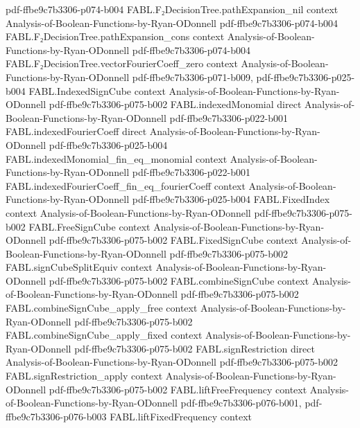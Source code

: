\begin{theorem}
  {pdf-ffbe9c7b3306-p074-b004}
\proofstep
  {FABL.F₂DecisionTree.pathExpansion_nil}
  {context}
  {Analysis-of-Boolean-Functions-by-Ryan-ODonnell}
  {pdf-ffbe9c7b3306-p074-b004}
\proofstep
  {FABL.F₂DecisionTree.pathExpansion_cons}
  {context}
  {Analysis-of-Boolean-Functions-by-Ryan-ODonnell}
  {pdf-ffbe9c7b3306-p074-b004}
\proofstep
  {FABL.F₂DecisionTree.vectorFourierCoeff_zero}
  {context}
  {Analysis-of-Boolean-Functions-by-Ryan-ODonnell}
  {pdf-ffbe9c7b3306-p071-b009,
    pdf-ffbe9c7b3306-p025-b004}
\proofstep
  {FABL.IndexedSignCube}
  {context}
  {Analysis-of-Boolean-Functions-by-Ryan-ODonnell}
  {pdf-ffbe9c7b3306-p075-b002}
\proofstep
  {FABL.indexedMonomial}
  {direct}
  {Analysis-of-Boolean-Functions-by-Ryan-ODonnell}
  {pdf-ffbe9c7b3306-p022-b001}
\proofstep
  {FABL.indexedFourierCoeff}
  {direct}
  {Analysis-of-Boolean-Functions-by-Ryan-ODonnell}
  {pdf-ffbe9c7b3306-p025-b004}
\proofstep
  {FABL.indexedMonomial_fin_eq_monomial}
  {context}
  {Analysis-of-Boolean-Functions-by-Ryan-ODonnell}
  {pdf-ffbe9c7b3306-p022-b001}
\proofstep
  {FABL.indexedFourierCoeff_fin_eq_fourierCoeff}
  {context}
  {Analysis-of-Boolean-Functions-by-Ryan-ODonnell}
  {pdf-ffbe9c7b3306-p025-b004}
\proofstep
  {FABL.FixedIndex}
  {context}
  {Analysis-of-Boolean-Functions-by-Ryan-ODonnell}
  {pdf-ffbe9c7b3306-p075-b002}
\proofstep
  {FABL.FreeSignCube}
  {context}
  {Analysis-of-Boolean-Functions-by-Ryan-ODonnell}
  {pdf-ffbe9c7b3306-p075-b002}
\proofstep
  {FABL.FixedSignCube}
  {context}
  {Analysis-of-Boolean-Functions-by-Ryan-ODonnell}
  {pdf-ffbe9c7b3306-p075-b002}
\proofstep
  {FABL.signCubeSplitEquiv}
  {context}
  {Analysis-of-Boolean-Functions-by-Ryan-ODonnell}
  {pdf-ffbe9c7b3306-p075-b002}
\proofstep
  {FABL.combineSignCube}
  {context}
  {Analysis-of-Boolean-Functions-by-Ryan-ODonnell}
  {pdf-ffbe9c7b3306-p075-b002}
\proofstep
  {FABL.combineSignCube_apply_free}
  {context}
  {Analysis-of-Boolean-Functions-by-Ryan-ODonnell}
  {pdf-ffbe9c7b3306-p075-b002}
\proofstep
  {FABL.combineSignCube_apply_fixed}
  {context}
  {Analysis-of-Boolean-Functions-by-Ryan-ODonnell}
  {pdf-ffbe9c7b3306-p075-b002}
\proofstep
  {FABL.signRestriction}
  {direct}
  {Analysis-of-Boolean-Functions-by-Ryan-ODonnell}
  {pdf-ffbe9c7b3306-p075-b002}
\proofstep
  {FABL.signRestriction_apply}
  {context}
  {Analysis-of-Boolean-Functions-by-Ryan-ODonnell}
  {pdf-ffbe9c7b3306-p075-b002}
\proofstep
  {FABL.liftFreeFrequency}
  {context}
  {Analysis-of-Boolean-Functions-by-Ryan-ODonnell}
  {pdf-ffbe9c7b3306-p076-b001,
    pdf-ffbe9c7b3306-p076-b003}
\proofstep
  {FABL.liftFixedFrequency}
  {context}

\end{theorem}
